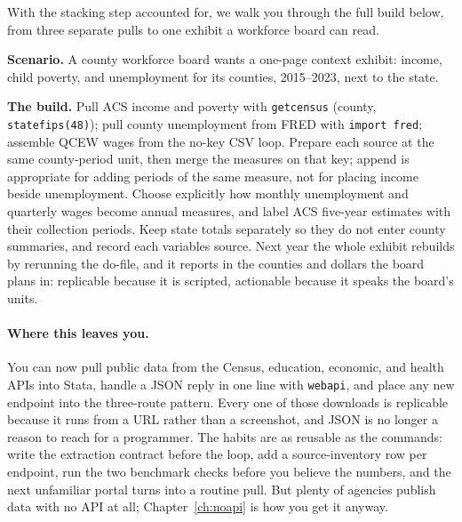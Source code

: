 \documentclass[
    a4paper,
    fontsize=10pt,
    twoside=true,
    numbers=noenddot,
]{kaobook}
\newcounter{appliedexample}
\newenvironment{appliedexample}[1][]{%
    \refstepcounter{appliedexample}%
    \begin{appliedexamplebox}[frametitle={Applied Example~\theappliedexample.~~#1}]%
}{%
    \end{appliedexamplebox}%
}
\begin{document}
With the stacking step accounted for, we walk you through the full build below, from three separate pulls to one exhibit a workforce board can read.

\begin{appliedexample}[A Texas county panel from three APIs]\label{ae:ch03-countypanel}
\textbf{Scenario.} A county workforce board wants a one-page context exhibit: income, child poverty, and unemployment for its counties, 2015--2023, next to the state.

\medskip
\textbf{The build.} Pull ACS income and poverty with \texttt{getcensus} (county, \texttt{statefips(48)}); pull county unemployment from FRED with \texttt{import fred}; assemble QCEW wages from the no-key CSV loop. Prepare each source at the same county-period unit, then merge the measures on that key; append is appropriate for adding periods of the same measure, not for placing income beside unemployment. Choose explicitly how monthly unemployment and quarterly wages become annual measures, and label ACS five-year estimates with their collection periods. Keep state totals separately so they do not enter county summaries, and record each variable\textquotesingle s source. Next year the whole exhibit rebuilds by rerunning the do-file, and it reports in the counties and dollars the board plans in: replicable because it is scripted, actionable because it speaks the board's units.
\end{appliedexample}

\paragraph{Where this leaves you.} You can now pull public data from the Census, education, economic, and health APIs into Stata, handle a JSON reply in one line with \texttt{webapi}, and place any new endpoint into the three-route pattern. Every one of those downloads is replicable because it runs from a URL rather than a screenshot, and JSON is no longer a reason to reach for a programmer. The habits are as reusable as the commands: write the extraction contract before the loop, add a source-inventory row per endpoint, run the two benchmark checks before you believe the numbers, and the next unfamiliar portal turns into a routine pull. But plenty of agencies publish data with no API at all; Chapter~\ref{ch:noapi} is how you get it anyway.
\end{document}
